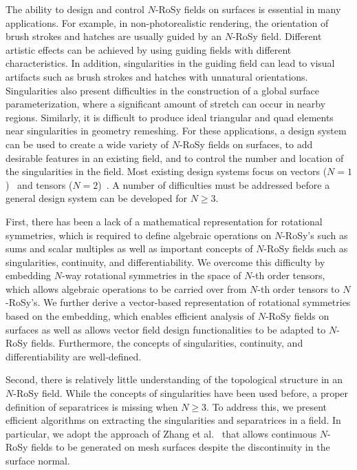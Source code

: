\documentclass{acmsiggraph}               %
\begin{document}
The ability to design and control $N$-RoSy fields on surfaces is
essential in many applications. For example, in non-photorealistic
rendering, the orientation of brush strokes and hatches are usually
guided by an $N$-RoSy field. Different artistic effects can be
achieved by using guiding fields with different characteristics. In
addition, singularities in the guiding field can lead to visual
artifacts such as brush strokes and hatches with unnatural
orientations. Singularities also present difficulties in the
construction of a global surface parameterization, where a
significant amount of stretch can occur in nearby regions.
Similarly, it is difficult to produce ideal triangular and quad
elements near singularities in geometry remeshing. For these
applications, a design system can be used to create a wide variety
of $N$-RoSy fields on surfaces, to add desirable features in an
existing field, and to control the number and location of the
singularities in the field. Most existing design systems focus on
vectors
($N=1$)~\cite{Praun:00,Turk:01,Wei:01,Theisel:02,Stam:03,Zhang:06}
and tensors ($N=2$)~\cite{Zhang:07}. A number of difficulties must
be addressed before a general design system can be developed for $N
\ge 3$.

First, there has been a lack of a mathematical representation for
rotational symmetries, which is required to define algebraic
operations on $N$-RoSy's such as sums and scalar multiples as well
as important concepts of $N$-RoSy fields such as singularities,
continuity, and differentiability.
We overcome this difficulty by embedding $N$-way rotational
symmetries in the space of $N$-th order tensors, which allows
algebraic operations to be carried over from $N$-th order tensors to
$N$-RoSy's. We further derive a vector-based representation of
rotational symmetries based on the embedding, which enables
efficient analysis of $N$-RoSy fields on surfaces as well as allows
vector field design functionalities to be adapted to $N$-RoSy
fields. Furthermore, the concepts of singularities, continuity, and
differentiability are well-defined.

Second, there is relatively little understanding of the topological
structure in an $N$-RoSy field. While the concepts of singularities
have been used before, a proper definition of separatrices is
missing when $N \ge 3$. To address this, we present efficient
algorithms on extracting the singularities and separatrices in a
field. In particular, we adopt the approach of Zhang et
al.~ that allows continuous $N$-RoSy fields to
be generated on mesh surfaces despite the discontinuity in the
surface normal.
\end{document}
